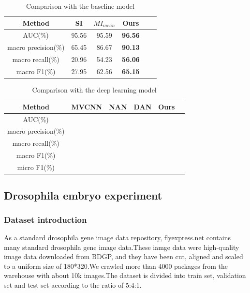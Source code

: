 \documentclass[10pt,twocolumn,letterpaper]{article}
\begin{document}
\begin{table}
\normalsize
\begin{center}
\begin{tabular}{|c|c|c|c|c|c|}
\hline
Method & SI & $MI_{mean}$ & Ours \\
\hline\hline
AUC(\%) & 95.56 & 95.59  & \textbf{96.56} \\
macro precision(\%) & 65.45 & 86.67 & \textbf{90.13} \\
macro recall(\%) & 20.96 & 54.23 & \textbf{56.06} \\
macro F1(\%) & 27.95 & 62.56 & \textbf{65.15} \\
\hline
\end{tabular}
\end{center}
\caption{Comparison with the baseline model}
\end{table}

\begin{table}
\normalsize
\begin{center}
\begin{tabular}{|c|c|c|c|c|c|}
\hline
Method & MVCNN & NAN & DAN & Ours \\
\hline\hline
AUC(\%) &  &  &  &  \\
macro precision(\%) &  &  &  & \\
macro recall(\%) &  &  &  & \\
macro F1(\%) &  &  &  &  \\
micro F1(\%) &  &  &  & \\
\hline
\end{tabular}
\end{center}
\caption{Comparison with the deep learning model}
\end{table}

\subsection{Drosophila embryo experiment}

\subsubsection{Dataset introduction}
As a standard drosophila gene image data repository\cite{ref26}, flyexpress.net contains many standard drosophila gene image data.These iamge data were high-quality image data downloaded from BDGP, and they have been cut, aligned and scaled to a uniform size of 180*320.We crawled more than 4000 packages from the warehouse with about 10k images.The dataset is divided into train set, validation set and test set according to the ratio of 5:4:1.
\end{document}
